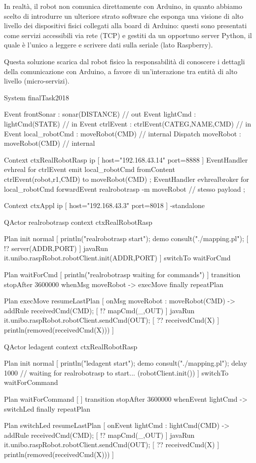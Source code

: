 \documentclass{../llncs}
\begin{document}
In realtà, il robot non comunica direttamente con Arduino, in quanto abbiamo scelto di introdurre un ulteriore strato software che esponga una visione di alto livello dei dispositivi fisici collegati alla board di Arduino: questi sono presentati come servizi accessibili via rete (TCP) e gestiti da un opportuno server Python, il quale è l'unico a leggere e scrivere dati sulla seriale (lato Raspberry).

Questa soluzione scarica dal robot fisico la responsabilità di conoscere i dettagli della comunicazione con Arduino, a favore di un'interazione tra entità di alto livello (micro-servizi).\\

\begin{qacode}[caption={../it.unibo.raspRobot/src/realrobot.qa}]
System finalTask2018            

Event frontSonar : sonar(DISTANCE)				// out
Event lightCmd : lightCmd(STATE)				// in
Event ctrlEvent : ctrlEvent(CATEG,NAME,CMD)		// in
Event local_robotCmd : moveRobot(CMD)			// internal
Dispatch moveRobot : moveRobot(CMD)				// internal

Context ctxRealRobotRasp ip [ host="192.168.43.14" port=8888 ]
EventHandler evhreal for ctrlEvent {
	emit local_robotCmd fromContent ctrlEvent(robot,r1,CMD) to moveRobot(CMD)
};
EventHandler evhrealbroker for local_robotCmd {
	forwardEvent realrobotrasp -m moveRobot		// stesso payload
};

Context ctxAppl ip [ host="192.168.43.3" port=8018 ] -standalone 

QActor realrobotrasp context ctxRealRobotRasp {
	Plan init normal [
	    println("realrobotrasp start");
		demo consult("./mapping.pl");
	    [ !? server(ADDR,PORT) ] javaRun it.unibo.raspRobot.robotClient.init(ADDR,PORT)
  	]
    switchTo waitForCmd
		
   	Plan waitForCmd [
   		println("realrobotrasp waiting for commands")
   	]
  	transition stopAfter 3600000
 		whenMsg moveRobot -> execMove
   	finally repeatPlan

  	Plan execMove resumeLastPlan [
     	onMsg moveRobot : moveRobot(CMD) -> addRule receivedCmd(CMD);
     	[ !? mapCmd(_,OUT) ] javaRun it.unibo.raspRobot.robotClient.sendCmd(OUT);
   		[ ?? receivedCmd(X) ] println(removed(receivedCmd(X)))
   	]
}

QActor ledagent context ctxRealRobotRasp {
	Plan init normal [
   		println("ledagent start");
		demo consult("./mapping.pl");
		delay 1000 // waiting for realrobotrasp to start... (robotClient.init())
   	]
   	switchTo waitForCommand
  
    Plan waitForCommand [ ]
    transition stopAfter 3600000
     	whenEvent lightCmd -> switchLed
    finally repeatPlan
   	 
	Plan switchLed resumeLastPlan [
 		onEvent lightCmd : lightCmd(CMD) -> addRule receivedCmd(CMD);
 		[ !? mapCmd(_,OUT) ] javaRun it.unibo.raspRobot.robotClient.sendCmd(OUT);
   		[ ?? receivedCmd(X) ] println(removed(receivedCmd(X)))
	]
}
\end{qacode}
%
\end{document}
